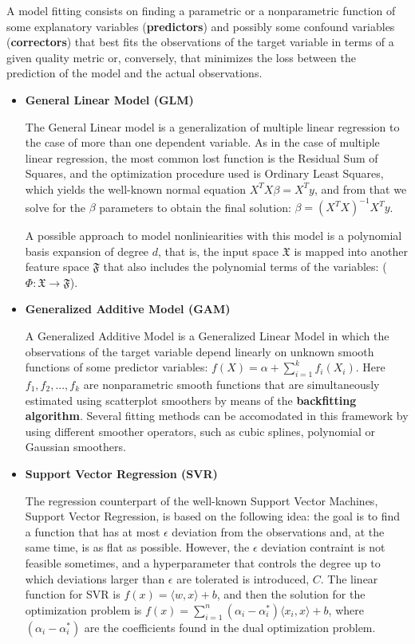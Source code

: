 \documentclass{article}
\begin{document}
A model fitting consists on finding a parametric or a nonparametric function of some explanatory variables (\textbf{predictors}) and possibly some confound variables (\textbf{correctors}) that best fits the observations of the target variable in terms of a given quality metric or, conversely, that minimizes the loss between the prediction of the model and the actual observations.
\begin{itemize}
\item \textbf{General Linear Model (GLM)} 

The General Linear model is a generalization of multiple linear regression to the case of more than one dependent variable. As in the case of multiple linear regression, the most common lost function is the Residual Sum of Squares, and the optimization procedure used is Ordinary Least Squares, which yields the well-known normal equation $ X^TX\beta = X^Ty $, and from that we solve for the $\beta$ parameters to obtain the final solution: $ \beta = (X^TX)^{-1}X^Ty $.

A possible approach to model nonliniearities with this model is a polynomial basis expansion of degree $d$, that is, the input space $\mathfrak{X}$ is mapped into another feature space $\mathfrak{F}$ that also includes the polynomial terms of the variables: ($\Phi : \mathfrak{X} \rightarrow \mathfrak{F}$).

\item \textbf{Generalized Additive Model (GAM)} 

A Generalized Additive Model is a Generalized Linear Model in which the observations of the target variable depend linearly on unknown smooth functions of some predictor variables: $ f(X) = \alpha + \sum_{i=1}^{k} f_i(X_i)$. Here $f_1, f_2, ..., f_k$ are nonparametric smooth functions that are simultaneously estimated using scatterplot smoothers by means of the \textbf{backfitting algorithm}. Several fitting methods can be accomodated in this framework by using different smoother operators, such as cubic splines, polynomial or Gaussian smoothers. 

\item \textbf{Support Vector Regression (SVR)} 

The regression counterpart of the well-known Support Vector Machines, Support Vector Regression, is based on the following idea: the goal is to find a function that has at most $\epsilon$ deviation from the observations and, at the same time, is as flat as possible. However, the $\epsilon$ deviation contraint is not feasible sometimes, and a hyperparameter that controls the degree up to which deviations larger than $\epsilon$ are tolerated is introduced, $C$. The linear function for SVR is $ f(x) = \langle w , x \rangle + b $, and then the solution for the optimization problem is $ f(x) = \sum_{i=1}^{n} (\alpha_i - \alpha^*_i)\langle x_i , x \rangle + b $, where $ (\alpha_i - \alpha^*_i) $ are the coefficients found in the dual optimization problem.


\end{itemize}
\end{document}
